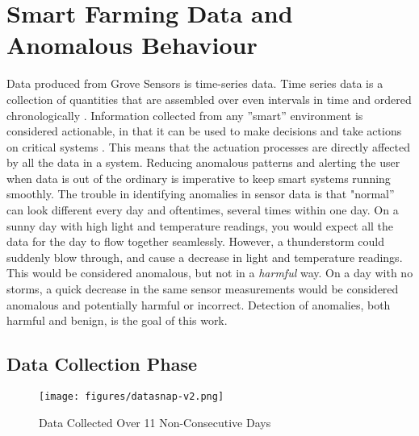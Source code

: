 \section{Smart Farming Data and Anomalous Behaviour}
\label{sec:data}
 Data produced from Grove Sensors is time-series data. Time series data is a collection of quantities that are assembled over even intervals in time and ordered chronologically \cite{fu2021hawatcher}. Information collected from any ”smart” environment is considered actionable, in that it can be used to make decisions and take actions on critical systems \cite{adwithauto}. This means that the actuation processes are directly affected by all the data in a system. Reducing anomalous patterns and alerting the user when data is out of the ordinary is imperative to keep smart systems running smoothly. The trouble in identifying anomalies in sensor data is that "normal” can look different every day and oftentimes, several times within one day. On a sunny day with high light and temperature readings, you would expect all the data for the day to flow together seamlessly. However, a thunderstorm could suddenly blow through, and cause a decrease in light and temperature readings. This would be considered anomalous, but not in a \textit{harmful} way. On a day with no storms, a quick decrease in the same sensor measurements would be considered anomalous and potentially harmful or incorrect. Detection of anomalies, both harmful and benign, is the goal of this work.

\subsection{Data Collection Phase}
 \begin{figure}[t!]
    \centering
    \texttt{[image: figures/datasnap-v2.png]}
    \caption{Data Collected Over 11 Non-Consecutive Days}
    \label{fig:data}
\end{figure}



